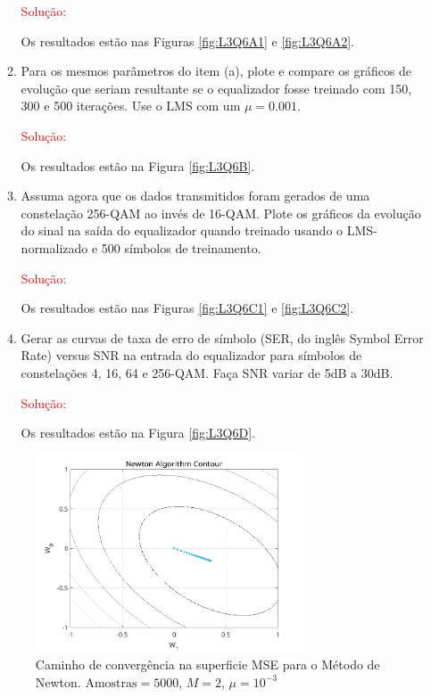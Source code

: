\documentclass[a4paper,10pt]{article}
\begin{document}
\begin{enumerate}
\begin{enumerate}
						\textcolor{red}{Solução:}

						Os resultados estão nas Figuras \ref{fig:L3Q6A1} e \ref{fig:L3Q6A2}.

					\item Para os mesmos parâmetros do item (a), plote e compare os gráﬁcos de evolução que seriam resultante se o equalizador fosse treinado com 150, 300 e 500 iterações. Use o LMS com um
					$\mu = 0.001$.
					
						\textcolor{red}{Solução:}

						Os resultados estão na Figura \ref{fig:L3Q6B}.

					\item Assuma agora que os dados transmitidos foram gerados de uma constelação 256-QAM ao invés de 16-QAM. Plote os gráﬁcos da evolução do sinal na saída do equalizador quando treinado
					usando o LMS-normalizado e 500 símbolos de treinamento.					
					
						\textcolor{red}{Solução:}

						Os resultados estão nas Figuras \ref{fig:L3Q6C1} e \ref{fig:L3Q6C2}.

					\item Gerar as curvas de taxa de erro de símbolo (SER, do inglês Symbol Error Rate) versus SNR na entrada do equalizador para símbolos de constelações 4, 16, 64 e 256-QAM. Faça SNR variar
					de 5dB a 30dB.
					
						\textcolor{red}{Solução:}

						Os resultados estão na Figura \ref{fig:L3Q6D}.

				\end{enumerate}
				
				\newpage
				\begin{figure}[!ht]
					\centering
					\includegraphics[width=0.75\textwidth]{figs/newton_contour.png}
					\caption{Caminho de convergência na superficie MSE para o Método de Newton. $\text{Amostras} = 5000$, $M = 2$, $\mu = 10^{-3}$}
					\label{fig:newton_contour}
				\end{figure}
				

\end{enumerate}
\end{document}
